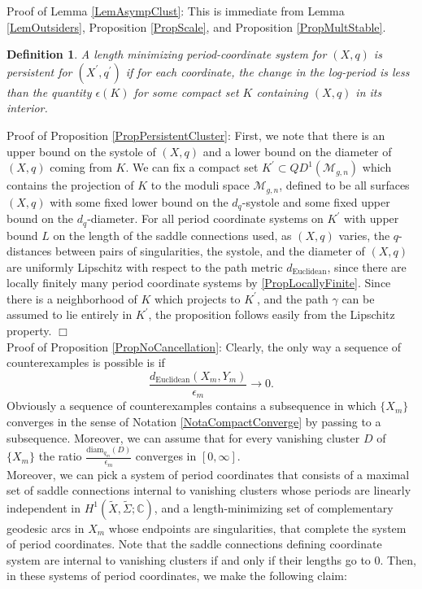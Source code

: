 \documentclass[12pt]{article}
\newtheorem{definition}[theorem]{Definition}
\newcommand{\cc}{\mathbb{C}}
\newcommand{\diam}{\mathrm{diam}}
\begin{document}
\noindent Proof of Lemma \ref{LemAsympClust}: This is immediate from Lemma \ref{LemOutsiders}, Proposition \ref{PropScale}, and Proposition \ref{PropMultStable}.

\begin{definition}A length minimizing period-coordinate system for $(X,q)$ is \emph{persistent} for $(X^\prime,q^\prime)$ if for each coordinate, the change in the log-period is less than the quantity $\epsilon(K)$ for some compact set $K$ containing $(X,q)$ in its interior.\end{definition}

\noindent Proof of Proposition \ref{PropPersistentCluster}: First, we note that there is an upper bound on the systole of $(X,q)$ and a lower bound on the diameter of $(X,q)$ coming from $K$. We can fix a compact set $K^\prime \subset QD^1(\mathcal{M}_{g,n})$ which contains the projection of $K$ to the moduli space $\mathcal{M}_{g,n}$, defined to be all surfaces $(X,q)$ with some fixed lower bound on the $d_q$-systole and some fixed upper bound on the $d_q$-diameter. For all period coordinate systems on $K^\prime$ with upper bound $L$ on the length of the saddle connections used, as $(X,q)$ varies, the $q$-distances between pairs of singularities, the systole, and the diameter of $(X,q)$ are uniformly Lipschitz with respect to the path metric $d_\mathrm{Euclidean}$, since there are locally finitely many period coordinate systems by \ref{PropLocallyFinite}. Since there is a neighborhood of $K$ which projects to $K^\prime$, and the path $\gamma$ can be assumed to lie entirely in $K^\prime$, the proposition follows easily from the Lipschitz property. $\Box$\\

\noindent Proof of Proposition \ref{PropNoCancellation}: Clearly, the only way a sequence of counterexamples is possible is if $$\frac{d_\mathrm{Euclidean}(X_m,Y_m)}{\epsilon_m} \to 0.$$ Obviously a sequence of counterexamples contains a subsequence in which $\{X_m\}$ converges in the sense of Notation \ref{NotaCompactConverge} by passing to a subsequence. Moreover, we can assume that for every vanishing cluster $D$ of $\{X_m\}$ the ratio $\frac{\diam_{q_m}(D)}{\epsilon_m}$ converges in $[0,\infty].$\\

\noindent Moreover, we can pick a system of period coordinates that consists of a maximal set of saddle connections internal to vanishing clusters whose periods are linearly independent in $H^1(\tilde{X},\tilde{\Sigma};\cc)$, and a length-minimizing set of complementary geodesic arcs in $X_m$ whose endpoints are singularities, that complete the system of period coordinates. Note that the saddle connections defining coordinate system are internal to vanishing clusters if and only if their lengths go to $0$. Then, in these systems of period coordinates, we make the following claim:
\end{document}
